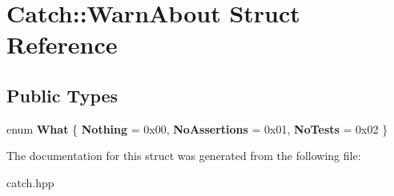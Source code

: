 \hypertarget{structCatch_1_1WarnAbout}{}\section{Catch\+:\+:Warn\+About Struct Reference}
\label{structCatch_1_1WarnAbout}
\subsection*{Public Types}
\begin{DoxyCompactItemize}
\item 
\mbox{\label{structCatch_1_1WarnAbout_ae3dde70ef78d700ea896eb29314e0fa3}} 
enum {\bfseries What} \{ {\bfseries Nothing} = 0x00, 
{\bfseries No\+Assertions} = 0x01, 
{\bfseries No\+Tests} = 0x02
 \}
\end{DoxyCompactItemize}


The documentation for this struct was generated from the following file\+:\begin{DoxyCompactItemize}
\item 
catch.\+hpp\end{DoxyCompactItemize}
